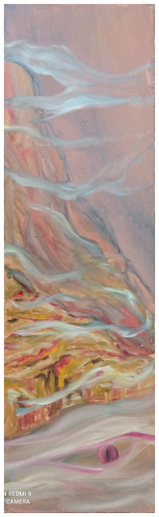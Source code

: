 \documentclass[twoside]{article}
\begin{document}
\begin{center}
    \newpage
    \includegraphics[width=\textwidth,height=\textheight,keepaspectratio]{assets/Tabla3.jpg}

\end{center}
\end{document}
